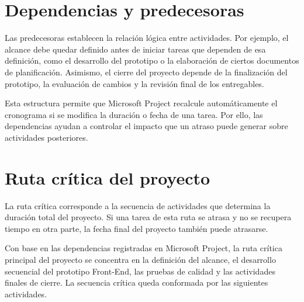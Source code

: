 \documentclass[11pt,spanish]{article}
\begin{document}
\section{Dependencias y predecesoras}

Las predecesoras establecen la relación lógica entre actividades. Por ejemplo, el alcance debe quedar definido antes de iniciar tareas que dependen de esa definición, como el desarrollo del prototipo o la elaboración de ciertos documentos de planificación. Asimismo, el cierre del proyecto depende de la finalización del prototipo, la evaluación de cambios y la revisión final de los entregables.

Esta estructura permite que Microsoft Project recalcule automáticamente el cronograma si se modifica la duración o fecha de una tarea. Por ello, las dependencias ayudan a controlar el impacto que un atraso puede generar sobre actividades posteriores.

\section{Ruta crítica del proyecto}

La ruta crítica corresponde a la secuencia de actividades que determina la duración total del proyecto. Si una tarea de esta ruta se atrasa y no se recupera tiempo en otra parte, la fecha final del proyecto también puede atrasarse.

Con base en las dependencias registradas en Microsoft Project, la ruta crítica principal del proyecto se concentra en la definición del alcance, el desarrollo secuencial del prototipo Front-End, las pruebas de calidad y las actividades finales de cierre. La secuencia crítica queda conformada por las siguientes actividades.
\end{document}
